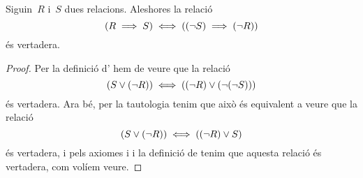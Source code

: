 \documentclass[../../main.tex]{subfiles}
\begin{document}
    \begin{tautology}
        \label{taut:llei de les contrarecíproques}
        Siguin~\(R\) i~\(S\) dues relacions.
        Aleshores la relació
        \[
            (R\implies S)\iff((\lnot S)\implies(\lnot R))
        \]
        és vertadera.
        \begin{proof}
            Per la definició d' hem de veure que la relació
            \[
                (S\lor(\lnot R))\iff((\lnot R)\lor(\lnot(\lnot S)))
            \]
            és vertadera.
            Ara bé, per la tautologia  tenim que això és equivalent a veure que la relació
            \[
                (S\lor(\lnot R))\iff((\lnot R)\lor S)
            \]
            és vertadera, i pels axiomes  i  i la definició de  tenim que aquesta relació és vertadera, com volíem veure.
        \end{proof}
    \end{tautology}
\end{document}
